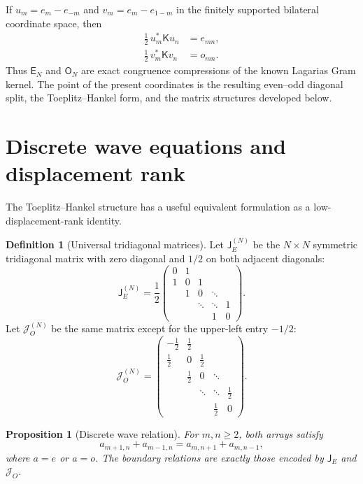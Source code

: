 \documentclass[11pt]{amsart}
\numberwithin{equation}{section}
\theoremstyle{plain}
\newtheorem{proposition}[theorem]{Proposition}
\theoremstyle{definition}
\newtheorem{definition}[theorem]{Definition}
\theoremstyle{remark}
\newcommand{\E}{\mathsf E}
\newcommand{\Omat}{\mathsf O}
\newcommand{\Kmat}{\mathsf K}
\newcommand{\J}{\mathsf J}
\begin{document}
If $u_m=e_m-e_{-m}$ and $v_m=e_m-e_{1-m}$ in the finitely supported bilateral coordinate space, then
\begin{align}
\frac12\,u_m^*\Kmat u_n
&=e_{mn},
\label{eq:E_reflection_compression}\\
\frac12\,v_m^*\Kmat v_n
&=o_{mn}.
\label{eq:O_reflection_compression}
\end{align}
Thus $\E_N$ and $\Omat_N$ are exact congruence compressions of the known Lagarias Gram kernel. The point of the present coordinates is the resulting even--odd diagonal split, the Toeplitz--Hankel form, and the matrix structures developed below.

\section{Discrete wave equations and displacement rank}
\label{sec:displacement}

The Toeplitz--Hankel structure has a useful equivalent formulation as a low-displacement-rank identity.

\begin{definition}[Universal tridiagonal matrices]
\label{def:universal_tridiagonal}
Let $\J_E^{(N)}$ be the $N\times N$ symmetric tridiagonal matrix with zero diagonal and $1/2$ on both adjacent diagonals:
\begin{equation}
\J_E^{(N)}=
\frac12
\begin{pmatrix}
0&1&&&\\
1&0&1&&\\
&1&0&\ddots&\\
&&\ddots&\ddots&1\\
&&&1&0
\end{pmatrix}.
\label{eq:J_E_definition}
\end{equation}
Let $\mathcal J_O^{(N)}$ be the same matrix except for the upper-left entry $-1/2$:
\begin{equation}
\mathcal J_O^{(N)}=
\begin{pmatrix}
-\tfrac12&\tfrac12&&&\\
\tfrac12&0&\tfrac12&&\\
&\tfrac12&0&\ddots&\\
&&\ddots&\ddots&\tfrac12\\
&&&\tfrac12&0
\end{pmatrix}.
\label{eq:J_O_definition}
\end{equation}
\end{definition}

\begin{proposition}[Discrete wave relation]
\label{prop:discrete_wave}
For $m,n\ge2$, both arrays satisfy
\begin{equation}
a_{m+1,n}+a_{m-1,n}
=a_{m,n+1}+a_{m,n-1},
\label{eq:discrete_wave}
\end{equation}
where $a=e$ or $a=o$. The boundary relations are exactly those encoded by $\J_E$ and $\mathcal J_O$.
\end{proposition}
\end{document}
